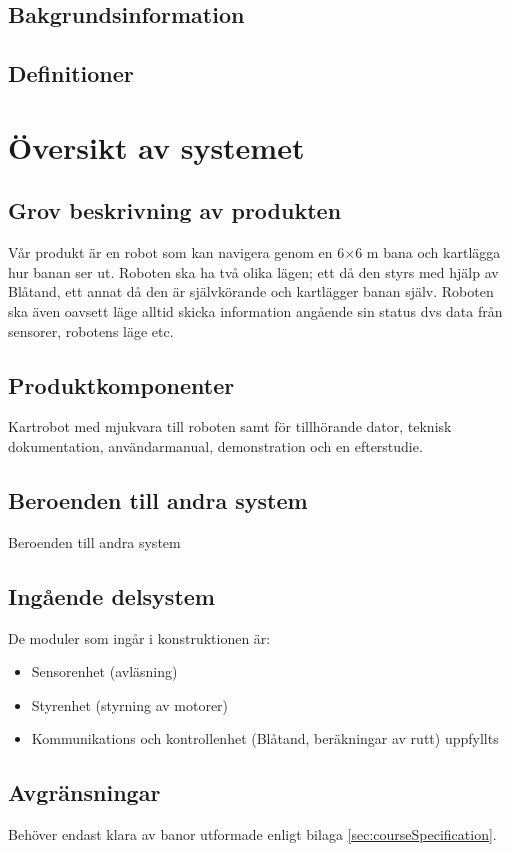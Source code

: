 \documentclass[a4paper,11pt]{article}
\begin{document}
\subsection{Bakgrundsinformation}
\subsection{Definitioner}


\section{Översikt av systemet}

\subsection{Grov beskrivning av produkten}
Vår produkt är en robot som kan navigera genom en 6$ \times $6 m bana och kartlägga hur banan ser ut. Roboten ska ha två olika lägen; ett då den styrs med hjälp av Blåtand, ett annat då den är självkörande och kartlägger banan själv. Roboten ska även oavsett läge alltid skicka information angående sin status dvs data från sensorer, robotens läge etc. 

\subsection{Produktkomponenter}
Kartrobot med mjukvara till roboten samt för tillhörande dator, teknisk dokumentation, användarmanual, demonstration och en efterstudie. 

\subsection{Beroenden till andra system }
Beroenden till andra system 

\subsection{Ingående delsystem}
De moduler som ingår i konstruktionen är:
\begin{itemize}
    \item Sensorenhet (avläsning) 
    \item Styrenhet (styrning av motorer) 
    \item Kommunikations och kontrollenhet (Blåtand, beräkningar av rutt)  uppfyllts 
\end{itemize}

\subsection{Avgränsningar}
Behöver endast klara av banor utformade enligt bilaga \ref{sec:courseSpecification}. 
\end{document}

